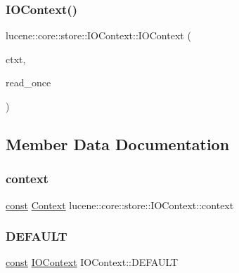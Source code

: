 \subsubsection{\texorpdfstring{I\+O\+Context()}{IOContext()}\hspace{0.1cm}{\footnotesize\ttfamily [7/7]}}
{\footnotesize\ttfamily lucene\+::core\+::store\+::\+I\+O\+Context\+::\+I\+O\+Context (\begin{DoxyParamCaption}\item[{\mbox{\hyperlink{ZlibCrc32_8h_a2c212835823e3c54a8ab6d95c652660e}{const}} \mbox{\hyperlink{classlucene_1_1core_1_1store_1_1IOContext}{I\+O\+Context}} \&}]{ctxt,  }\item[{\mbox{\hyperlink{ZlibCrc32_8h_a2c212835823e3c54a8ab6d95c652660e}{const}} bool}]{read\+\_\+once }\end{DoxyParamCaption})\hspace{0.3cm}{\ttfamily [inline]}}



\subsection{Member Data Documentation}
\mbox{\label{classlucene_1_1core_1_1store_1_1IOContext_a9ed3b29ed842a780f6bd8cbe0bb4f215}} 
\subsubsection{\texorpdfstring{context}{context}}
{\footnotesize\ttfamily \mbox{\hyperlink{ZlibCrc32_8h_a2c212835823e3c54a8ab6d95c652660e}{const}} \mbox{\hyperlink{classlucene_1_1core_1_1store_1_1IOContext_abe5d85deaa062a50cf92336fd3aeea96}{Context}} lucene\+::core\+::store\+::\+I\+O\+Context\+::context}

\mbox{\label{classlucene_1_1core_1_1store_1_1IOContext_a354acead9c7f7b0f1d1c0a0717b2c0aa}} 
\subsubsection{\texorpdfstring{D\+E\+F\+A\+U\+LT}{DEFAULT}}
{\footnotesize\ttfamily \mbox{\hyperlink{ZlibCrc32_8h_a2c212835823e3c54a8ab6d95c652660e}{const}} \mbox{\hyperlink{classlucene_1_1core_1_1store_1_1IOContext}{I\+O\+Context}} I\+O\+Context\+::\+D\+E\+F\+A\+U\+LT\hspace{0.3cm}{\ttfamily [static]}}

